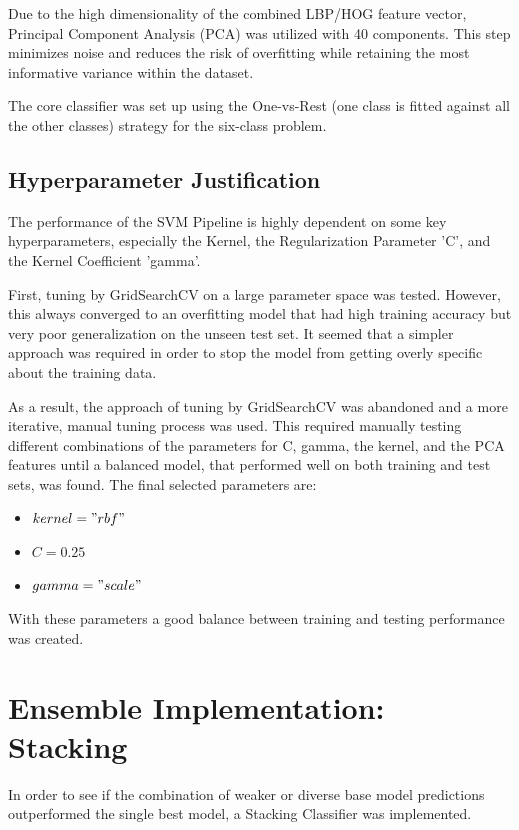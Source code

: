 Due to the high dimensionality of the combined LBP/HOG feature vector, Principal Component Analysis (PCA) was utilized with 40 components. This step minimizes noise and reduces the risk of overfitting while retaining the most informative variance within the dataset.

The core classifier was set up using the One-vs-Rest (one class is fitted against all the other classes) strategy for the six-class problem.

\subsection{Hyperparameter Justification}

The performance of the SVM Pipeline is highly dependent on some key hyperparameters, especially the Kernel, the Regularization Parameter 'C', and the Kernel Coefficient 'gamma'.

First, tuning by GridSearchCV on a large parameter space was tested. However, this always converged to an overfitting model that had high training accuracy but very poor generalization on the unseen test set. It seemed that a simpler approach was required in order to stop the model from getting overly specific about the training data.

As a result, the approach of tuning by GridSearchCV was abandoned and a more iterative, manual tuning process was used. This required manually testing different combinations of the parameters for C, gamma, the kernel, and the PCA features until a balanced model, that performed well on both training and test sets, was found. The final selected parameters are:

\begin{itemize}
	\item $kernel = "rbf"$
	\item $C = 0.25$
	\item $gamma = "scale"$
\end{itemize}

With these parameters a good balance between training and testing performance was created.
\newline

\section{Ensemble Implementation: Stacking}

In order to see if the combination of weaker or diverse base model predictions outperformed the single best model, a Stacking Classifier was implemented.

